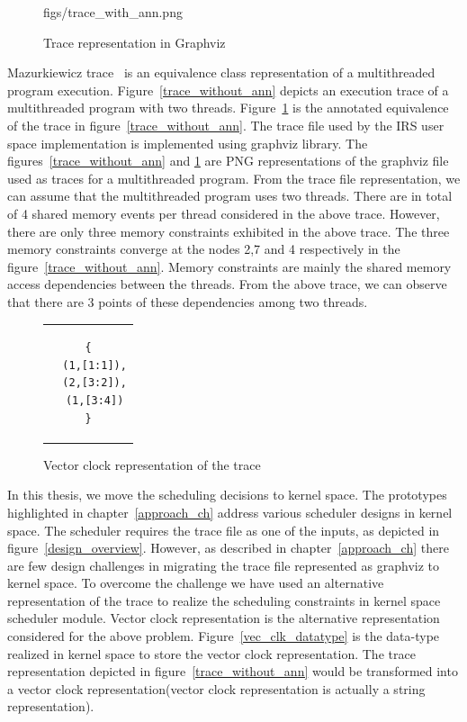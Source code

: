 \begin{figure}[h]
{{figs/trace_with_ann.png}
\label{trace_with_ann}}
     \caption{Trace representation in Graphviz}
\end{figure}

Mazurkiewicz trace~\citep{mazurkiewicz1986trace} is an  equivalence class representation of a multithreaded program execution. 
Figure~\ref{trace_without_ann} depicts an execution trace of a multithreaded program with two threads. 
Figure~\ref{trace_with_ann} is the annotated equivalence  of the trace in figure~\ref{trace_without_ann}. 
The trace file used by the IRS user space implementation is implemented using graphviz library. 
The figures~\ref{trace_without_ann} and \ref{trace_with_ann} are PNG representations of the graphviz file used as traces for a multithreaded program. 
From the trace file representation, we can assume that the multithreaded program uses two threads. 
There are in total of 4 shared memory events per thread considered in the above trace. 
However, there are only three memory constraints exhibited in the above trace. 
The three memory constraints converge at the nodes 2,7 and 4 respectively in the figure~\ref{trace_without_ann}. 
Memory constraints are mainly the shared memory access dependencies between the threads. 
From the above trace, we can observe that there are 3 points of these dependencies among two threads. 

\begin{figure}[h]
\centering
\begin{tabular}{c}
\begin{lstlisting}
{
  (1,[1:1]),
  (2,[3:2]),
  (1,[3:4])
}
\end{lstlisting}
\end{tabular}
\caption{Vector clock representation of the trace}
\label{vec_clk_repr}
\end{figure}


In this thesis, we move the scheduling decisions to kernel space. 
The prototypes highlighted in chapter~\ref{approach_ch} address various scheduler designs in kernel space. 
The scheduler requires the trace file as one of the inputs, as depicted in figure~\ref{design_overview}. 
However, as described in chapter~\ref{approach_ch} there are few design challenges in migrating the trace file represented as graphviz to kernel space. 
To overcome the challenge we have used an alternative representation of the trace to realize the scheduling constraints in kernel space scheduler module. 
Vector clock representation is the alternative representation considered for the above problem. 
Figure~\ref{vec_clk_datatype} is the data-type realized in kernel space to store the vector clock representation. 
The trace representation depicted in figure~\ref{trace_without_ann} would be transformed into a vector clock representation(vector clock representation is actually a string representation). 

